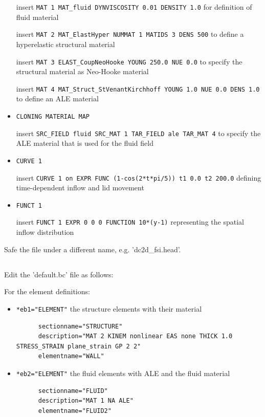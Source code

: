 \begin{itemize}
 insert \verb|MAT 1 MAT_fluid DYNVISCOSITY 0.01 DENSITY 1.0| for definition of
 fluid material
 
 insert \verb|MAT 2 MAT_ElastHyper NUMMAT 1 MATIDS 3 DENS 500| to define a
 hyperelastic structural material

 insert \verb|MAT 3 ELAST_CoupNeoHooke YOUNG 250.0 NUE 0.0| to specify the
 structural material as Neo-Hooke material
 
 insert \verb|MAT 4 MAT_Struct_StVenantKirchhoff YOUNG 1.0 NUE 0.0 DENS 1.0| to
 define an ALE material

 \item \verb|CLONING MATERIAL MAP|

 insert \verb|SRC_FIELD fluid SRC_MAT 1 TAR_FIELD ale TAR_MAT 4| to specify the
 ALE material that is used for the fluid field 

 \item \verb|CURVE 1|

 insert \verb|CURVE 1 on EXPR FUNC (1-cos(2*t*pi/5)) t1 0.0 t2 200.0| defining
time-dependent inflow and lid movement
 
  \item \verb|FUNCT 1|

 insert \verb|FUNCT 1 EXPR 0 0 0 FUNCTION 10*(y-1)| representing the spatial
 inflow distribution

\end{itemize}
Safe the file under a different name, e.g. 'dc2d\_fsi.head'.

\subsection{\bc}
Edit the 'default.bc' file as follows:

For the element definitions:

\begin{itemize}
  \item \verb|*eb1="ELEMENT"| \qquad the structure elements with their material
  \begin{small} \begin{verbatim}
      sectionname="STRUCTURE"
      description="MAT 2 KINEM nonlinear EAS none THICK 1.0 STRESS_STRAIN plane_strain GP 2 2"
      elementname="WALL"
    \end{verbatim} 
  \end{small}
 
 \item \verb|*eb2="ELEMENT"| \qquad the fluid elements with ALE and the
 fluid material
 \begin{small} \begin{verbatim}
      sectionname="FLUID"
      description="MAT 1 NA ALE"
      elementname="FLUID2"
    \end{verbatim} 
  \end{small}
\end{itemize}

